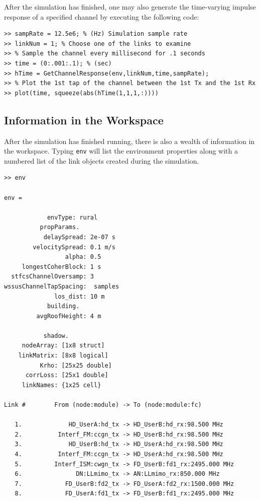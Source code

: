 After the simulation has finished, one may also generate the time-varying impulse response of a specified channel by executing the following code:

\begin{lstlisting}[numbers=none]
>> sampRate = 12.5e6; % (Hz) Simulation sample rate
>> linkNum = 1; % Choose one of the links to examine
>> % Sample the channel every millisecond for .1 seconds
>> time = (0:.001:.1); % (sec)
>> hTime = GetChannelResponse(env,linkNum,time,sampRate);
>> % Plot the 1st tap of the channel between the 1st Tx and the 1st Rx
>> plot(time, squeeze(abs(hTime(1,1,1,:))))
\end{lstlisting}


\subsection{Information in the Workspace}
After the simulation has finished running, there is also a wealth of
information in the workspace.  Typing \verb+env+ will list the
environment properties along with a numbered list of the link
objects created during the simulation.

\begin{lstlisting}[numbers=none]
>> env

env =

            envType: rural
          propParams.
           delaySpread: 2e-07 s
        velocitySpread: 0.1 m/s
                 alpha: 0.5
     longestCoherBlock: 1 s
  stfcsChannelOversamp: 3
wssusChannelTapSpacing:  samples
              los_dist: 10 m
            building.
         avgRoofHeight: 4 m

           shadow.
     nodeArray: [1x8 struct]
    linkMatrix: [8x8 logical]
          Krho: [25x25 double]
      corrLoss: [25x1 double]
     linkNames: {1x25 cell}

Link #        From (node:module) -> To (node:module:fc)

   1.             HD_UserA:hd_tx -> HD_UserB:hd_rx:98.500 MHz
   2.          Interf_FM:ccgn_tx -> HD_UserB:hd_rx:98.500 MHz
   3.             HD_UserB:hd_tx -> HD_UserA:hd_rx:98.500 MHz
   4.          Interf_FM:ccgn_tx -> HD_UserA:hd_rx:98.500 MHz
   5.         Interf_ISM:cwgn_tx -> FD_UserB:fd1_rx:2495.000 MHz
   6.               DN:LLmimo_tx -> AN:LLmimo_rx:850.000 MHz
   7.            FD_UserB:fd2_tx -> FD_UserA:fd2_rx:1500.000 MHz
   8.            FD_UserA:fd1_tx -> FD_UserB:fd1_rx:2495.000 MHz
\end{lstlisting}


